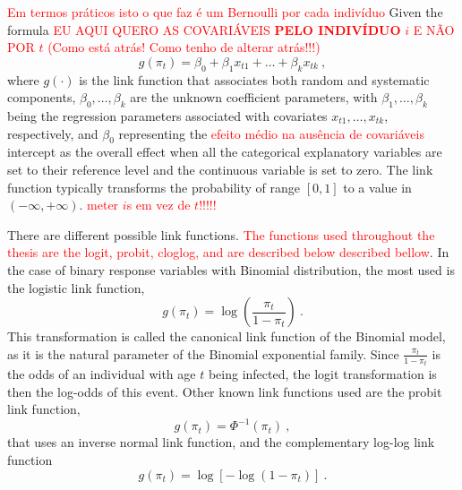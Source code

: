 \textcolor{red}{Em termos práticos isto o que faz é um Bernoulli por cada indivíduo}
Given the formula
%
\textcolor{red}{EU AQUI QUERO AS COVARIÁVEIS \textbf{PELO INDIVÍDUO} $i$ E NÃO POR $t$ (Como está atrás! Como tenho de alterar atrás!!!)}
\begin{equation}
    \label{eq:link}
    g(\pi_t)=\beta_0+\beta_1x_{t1}+\dots+\beta_k x_{tk}\ ,
\end{equation}
%
\noindent
where $g(\cdot)$ is the link function that associates both random and systematic components, $\beta_0,\ldots,\beta_k$ are the unknown coefficient parameters, with $\beta_{1},\ldots,\beta_{k}$ being the regression parameters associated with covariates $x_{t1},\ldots,x_{tk}$, respectively, and $\beta_{0}$ representing the \textcolor{red}{efeito médio na ausência de covariáveis} intercept as the overall effect when all the categorical explanatory variables are set to their reference level and the continuous variable is set to zero.
The link function typically transforms the probability of range $[0,1]$ to a value in $(-\infty, +\infty)$.
\textcolor{red}{meter $i$s em vez de $t$!!!!!}

There are different possible link functions.
\textcolor{red}{The functions used throughout the thesis are the logit, probit, cloglog, and are described below described bellow}.
In the case of binary response variables with Binomial distribution, the most used is the logistic link function,
%
\begin{equation}
    \label{eq:logit}
    g(\pi_t)=\log\left(\frac{\pi_t}{1-\pi_t}\right)\ .
\end{equation}
%
\noindent
This transformation is called the canonical link function of the Binomial model, as it is the natural parameter of the Binomial exponential family.
Since $\frac{\pi_t}{1-\pi_t}$ is the  odds  of an individual with age $t$ being infected, the logit transformation is then the log-odds of this event.
Other known link functions used are the probit link function,
%
\begin{equation}
    \label{eq:probit}
    g(\pi_t)=\Phi^{-1}(\pi_t)\ ,
\end{equation}
%
\noindent
that uses an inverse normal link function, and the complementary log-log link function
%
\begin{equation}
    \label{eq:cloglog}
    g(\pi_t)=\log[-\log(1-\pi_t)]\ .
\end{equation}

